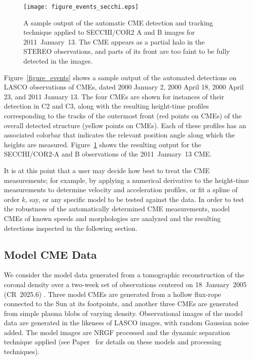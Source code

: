 \documentclass[preprint2]{aastex}
\newcommand{\RNum}[1]{\uppercase\expandafter{\romannumeral #1\relax}}
\begin{document}
\begin{figure}[!t]
\centerline{\texttt{[image: figure\_events\_secchi.eps]}}
\caption{A sample output of the automatic CME detection and tracking technique applied to SECCHI/COR2 A and B images for 2011~January~13. The CME appears as a partial halo in the STEREO observations, and parts of its front are too faint to be fully detected in the images.}
\label{figure_events_secchi}
\end{figure}

Figure~\ref{figure_events} shows a sample output of the automated detections on LASCO observations of CMEs, dated 2000 January 2, 2000 April 18, 2000 April 23, and 2011 January 13. The four CMEs are shown for instances of their detection in C2 and C3, along with the resulting height-time profiles corresponding to the tracks of the outermost front (red points on CMEs) of the overall detected structure (yellow points on CMEs). Each of these profiles has an associated colorbar that indicates the relevant position angle along which the heights are measured. Figure~\ref{figure_events_secchi} shows the resulting output for the SECCHI/COR2-A and B observations of the 2011~January~13 CME.

It is at this point that a user may decide how best to treat the CME measurements; for example, by applying a numerical derivative to the height-time measurements to determine velocity and acceleration profiles, or fit a spline of order $k$, say, or any specific model to be tested against the data. In order to test the robustness of the automatically determined CME measurements, model CMEs of known speeds and morphologies are analyzed and the resulting detections inspected in the following section.


\subsection{Model CME Data}

We consider the model data generated from a tomographic reconstruction of the coronal density over a two-week set of observations centered on 18~January~2005 (CR~2025.6) \citep{2009ApJ...690.1119M}. Three model CMEs are generated from a hollow flux-rope connected to the Sun at its footpoints, and another three CMEs are generated from simple plasma blobs of varying density. Observational images of the model data are generated in the likeness of LASCO images, with random Gaussian noise added. The model images are NRGF processed and the dynamic separation technique applied (see Paper~\RNum{1} for details on these models and processing techniques).
\end{document}

